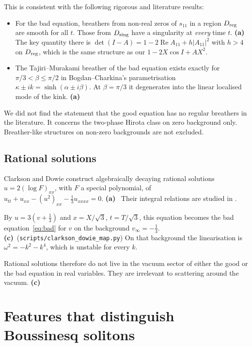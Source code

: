 \documentclass[11pt,a4paper]{article}
\newcommand{\La}{\textsf{\textbf{(a)}}}
\newcommand{\Lc}{\textsf{\textbf{(c)}}}
\newcommand{\script}[1]{\texttt{scripts/#1}}
\theoremstyle{remark}
\begin{document}
This is consistent with the following rigorous and literature results:
\begin{itemize}
\item For the bad equation, breathers from non-real zeros of $s_{11}$ in a region $D_{\rm reg}$ are smooth for all $t$. Those from $D_{\rm sing}$ have a singularity at \emph{every} time $t$. \La~\cite[Lemma A.4]{CL-SOL} The key quantity there is $\det(I-A)=1-2\operatorname{Re}A_{11}+h|A_{11}|^2$ with $h>4$ on $D_{\rm reg}$, which is the same structure as our $1-2X\cos I+AX^2$.
\item The Tajiri--Murakami breather of the bad equation exists exactly for $\pi/3<\beta\le\pi/2$ in Bogdan--Charkina's parametrisation $\kappa\pm ik=\sinh(\alpha\pm i\beta)$. At $\beta=\pi/3$ it degenerates into the linear localised mode of the kink. \La~\cite[(29)--(41)]{BC}
\end{itemize}

We did not find the statement that the good equation has no regular breathers in the literature. It concerns the two-phase Hirota class on zero background only. Breather-like structures on non-zero backgrounds \cite{BD} are not excluded.

\subsection{Rational solutions}\label{sec:rational}

Clarkson and Dowie construct algebraically decaying rational solutions $u=2(\log F)_{xx}$, with $F$ a special polynomial, of $u_{tt}+u_{xx}-(u^2)_{xx}-\tfrac13u_{xxxx}=0$. \La~\cite{CD} Their integral relations are studied in \cite{ABCD}.

By $u=3(v+\tfrac13)$ and $x=X/\sqrt3$, $t=T/\sqrt3$, this equation becomes the bad equation~\eqref{eq:bad} for $v$ on the background $v_\infty=-\tfrac13$. \Lc\ (\script{clarkson\_dowie\_map.py}) On that background the linearisation is $\omega^2=-k^2-k^4$, which is unstable for every $k$.

Rational solutions therefore do not live in the vacuum sector of either the good or the bad equation in real variables. They are irrelevant to scattering around the vacuum. \Lc

\section{Features that distinguish Boussinesq solitons}\label{sec:features}
\end{document}
